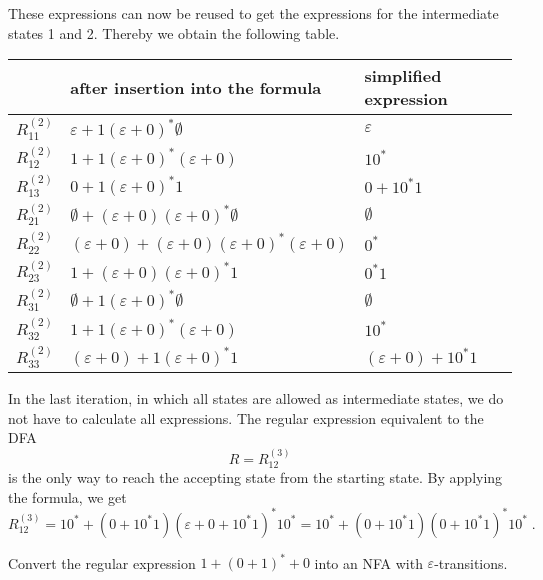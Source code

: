 \documentclass{exercise}
\begin{document}
\begin{solution}
    These expressions can now be reused to get the expressions for the intermediate states
    1 and 2. Thereby we obtain the following table.
    \begin{center}
    \begin{tabular}{l|l|l}
       & after insertion into the formula & simplified expression\\
       \hline
       $R_{11}^{(2)}$ & $\varepsilon + 1(\varepsilon+0)^*\emptyset$                         & $\varepsilon$   \\
       $R_{12}^{(2)}$ & $1 + 1(\varepsilon+0)^*(\varepsilon+0)$                             & $10^*$          \\
       $R_{13}^{(2)}$ & $0 + 1(\varepsilon+0)^*1$                                           & $0+10^*1$       \\
       $R_{21}^{(2)}$ & $\emptyset + (\varepsilon+0)(\varepsilon+0)^*\emptyset$             & $\emptyset$     \\
       $R_{22}^{(2)}$ & $(\varepsilon+0)+(\varepsilon+0)(\varepsilon+0)^*(\varepsilon + 0)$ & $0^*$           \\
       $R_{23}^{(2)}$ & $1+(\varepsilon+0)(\varepsilon+0)^*1$                               & $0^*1$          \\
       $R_{31}^{(2)}$ & $\emptyset+1(\varepsilon+0)^*\emptyset$                             & $\emptyset$     \\
       $R_{32}^{(2)}$ & $1+1(\varepsilon+0)^*(\varepsilon+0)$                               & $10^*$          \\
       $R_{33}^{(2)}$ & $(\varepsilon+0)+1(\varepsilon+0)^*1$                               & $(\varepsilon+0) + 10^*1$
    \end{tabular}
    \end{center}
    
    In the last iteration, in which all states are allowed as intermediate states, we do not
    have to calculate all expressions.  The regular expression equivalent to the DFA
    \[ R = R_{12}^{(3)} \]
    is the only way to reach the accepting state from the starting state. By applying the
    formula, we get
    \[ R_{12}^{(3)} = 10^* + (0+10^*1)(\varepsilon+0+10^*1)^*10^* = 10^* + (0+10^*1)(0+10^*1)^*10^*\;. \] 
  \end{solution}

\subtask Convert the regular expression $1+(0+1)^*+0$ into an NFA with
  $\varepsilon$-transitions.
\end{document}
